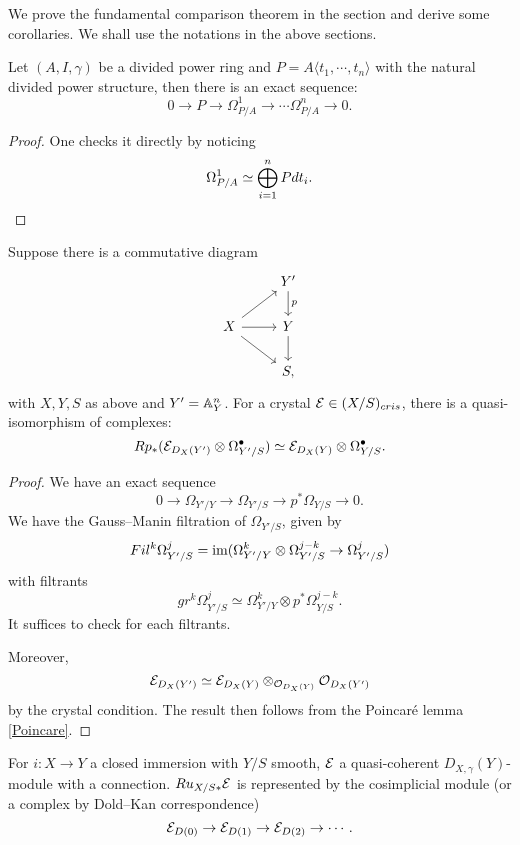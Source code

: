 We prove the fundamental comparison theorem in the section 
and derive some corollaries. 
We shall use the notations in the above sections.
\begin{lemma}
    \label{Poincare}
    Let $(A, I, \gamma)$ be a divided power ring and 
    $P = A \langle t_1, \cdots, t_n \rangle$ 
    with the natural divided power structure, 
    then there is an exact sequence:
    \[
        0 \to P \to \Omega_{P/A}^1 \to \cdots \Omega_{P/A}^n \to 0.
    \]
\end{lemma}

\begin{proof}
    One checks it directly by noticing
    \[
        \Omega_{P/A}^1 \simeq \bigoplus_{i = 1}^n Pdt_i.
        \qedhere
    \]
\end{proof}

\begin{lemma}
    \label{comparison}
    Suppose there is a commutative diagram 
    \[
        \begin{tikzcd}
            & Y'\ar[d,"p"] \\
            X \ar[r] \ar[ur] \ar[dr] & Y \ar[d] \\
            & S,
        \end{tikzcd}
    \]
    with $X, Y, S$ as above and $Y' = {\mathbb {A}}^n_Y$. 
    For a crystal ${\mathcal {E}} \in (X/S)_{cris}$, 
    there is a quasi-isomorphism of complexes:
    \[
        Rp_*({\mathcal {E}}_{D_X(Y')} \otimes \Omega_{Y'/S}^\bullet) 
        \simeq {\mathcal {E}}_{D_X(Y)} \otimes \Omega_{Y/S}^\bullet.
    \] 
\end{lemma}
\begin{proof}
    We have an exact sequence
    \[
        0 \to \Omega_{Y'/Y} \to 
        \Omega_{Y'/S} \to p^*\Omega_{Y/S} \to 0.
    \] 
    We have the Gauss--Manin filtration of $\Omega_{Y'/S}$, 
    given by 
    \[
        Fil^k\Omega_{Y'/S}^j = 
        \operatorname{im}(\Omega_{Y'/Y}^k \otimes \Omega_{Y'/S}^{j-k} \to \Omega_{Y'/S}^j)
    \]
    with filtrants 
    \[
        gr^k \Omega_{Y'/S}^j \simeq 
        \Omega_{Y'/Y}^k \otimes p^* \Omega_{Y/S}^{j-k}.
    \] 
    It suffices to check for each filtrants.

    Moreover,
    \[
        {\mathcal {E}}_{D_X(Y')} \simeq 
        {\mathcal {E}}_{D_X(Y)} \otimes_{{\mathcal {O}}_{D_X(Y)}} {\mathcal {O}}_{D_X(Y')}
    \]
    by the crystal condition. 
    The result then follows from the Poincar\'e lemma \ref{Poincare}.
\end{proof}

\begin{lemma}
    \label{Cech}
    For $i \colon X\to Y$ a closed immersion with $Y/S$ smooth, 
    ${\mathcal {E}}$ a quasi-coherent $D_{X,\gamma}(Y)$-module with a connection. 
    $Ru_{X/S*}{\mathcal {E}}$ is represented by the cosimplicial module 
    (or a complex by Dold--Kan correspondence)
    \[
        {\mathcal {E}}_{D(0)} \to {\mathcal {E}}_{D(1)} \to {\mathcal {E}}_{D(2)} \to \cdots.
    \]
\end{lemma}

